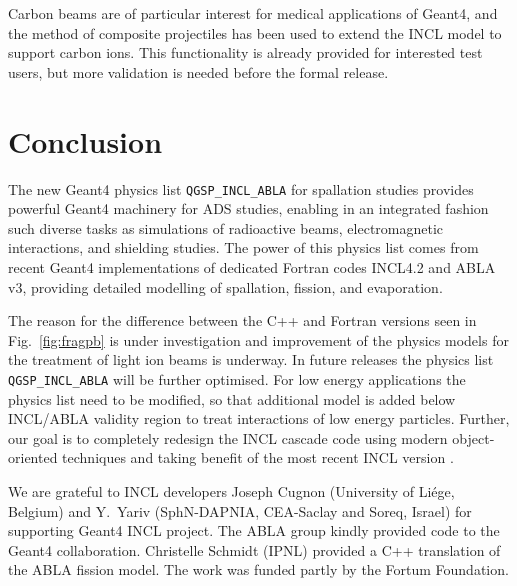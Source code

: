 \documentclass[a4paper]{jpconf}
\begin{document}
Carbon beams are of particular interest for medical applications of Geant4, 
and the method of composite projectiles has been used to extend the INCL model to support carbon ions.
This functionality is already provided for interested test users, 
but more validation is needed before the formal release.

\section{Conclusion}\label{sec:conclusion}
The new Geant4 physics list {\tt QGSP\_\-INCL\_ABLA} for spallation studies 
provides powerful Geant4 machinery for ADS studies, enabling in an integrated fashion 
such diverse tasks as simulations of radioactive beams, 
electromagnetic interactions, and shielding studies. 
The power of this physics list comes from recent Geant4 implementations of 
dedicated  Fortran codes INCL4.2 and ABLA v3, providing detailed modelling
of spallation, fission, and evaporation.



The reason for the difference between the C++ and 
Fortran versions seen in Fig.~\ref{fig:fragpb} is under investigation and
improvement of the physics models for the treatment of light ion beams is underway.
In future releases the physics list {\tt QGSP\_\-INCL\_ABLA} will be further optimised. 
For low energy applications the physics list need to be modified,
so that additional model is added below INCL/ABLA validity region to treat interactions of low energy particles.
Further, our goal is to completely redesign the INCL cascade code using modern object-oriented techniques
and taking benefit of the most recent INCL version \cite{inclTrieste}.

\ack %
We are grateful to INCL developers Joseph Cugnon (University of Li\'{e}ge, Belgium) and 
Y.~Yariv (SphN-DAPNIA, CEA-Saclay and Soreq, Israel) for supporting Geant4 INCL project.
The ABLA group kindly provided code to the Geant4 collaboration. 
Christelle Schmidt (IPNL) provided a C++ translation of the ABLA fission model. 
The work was funded partly by the Fortum Foundation.

\end{document}
